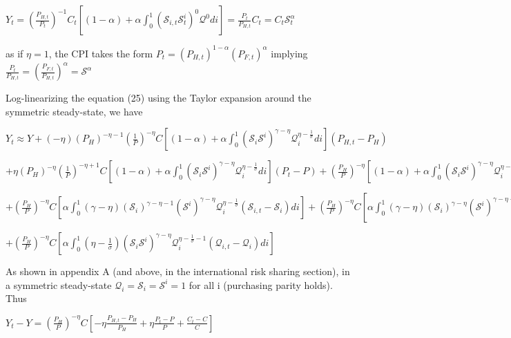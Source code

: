 \documentclass[
]{article}
\begin{document}
\(\displaystyle Y_t = \left( \frac{P_{H,t}}{P_t} \right)^{-1} C_t \left[ (1-\alpha) + \alpha \int_0^1 \left( \mathcal{S}_{i,t} \mathcal{S}_t^i\right)^{0} \mathcal{Q}^{0} di \right] = \frac{P_{t}}{P_{H,t}} C_t=C_t \mathcal{S}_t^\alpha\)

as if \(\eta=1\), the CPI takes the form
\(P_t=(P_{H,t})^{1-\alpha}(P_{F,t})^\alpha\) implying
\(\displaystyle \frac{P_t}{P_{H,t}}=\left( \frac{P_{F,t}}{P_{H,t}} \right)^\alpha=\mathcal{S}^\alpha\)

Log-linearizing the equation (25) using the Taylor expansion around the
symmetric steady-state, we have

\(\displaystyle Y_t \approx Y + (-\eta)\left( P_H \right)^{-\eta-1}\left( \frac{1}{P} \right)^{-\eta}C \left[ (1-\alpha) + \alpha \int_0^1 \left( \mathcal{S}_{i} \mathcal{S}^i\right)^{\gamma-\eta} \mathcal{Q}_i^{\eta-\frac{1}{\sigma}} di \right](P_{H,t}-P_H)\)

\(\displaystyle + \eta\left( P_H \right)^{-\eta}\left( \frac{1}{P} \right)^{-\eta+1}C \left[ (1-\alpha) + \alpha \int_0^1 \left( \mathcal{S}_{i} \mathcal{S}^i\right)^{\gamma-\eta} \mathcal{Q}_i^{\eta-\frac{1}{\sigma}} di \right](P_t-P) +\left( \frac{P_H}{P} \right)^{-\eta} \left[ (1-\alpha) + \alpha \int_0^1 \left( \mathcal{S}_{i} \mathcal{S}^i\right)^{\gamma-\eta} \mathcal{Q}_i^{\eta-\frac{1}{\sigma}} di \right](C_{t}-C)\)

\(\displaystyle +\left( \frac{P_H}{P} \right)^{-\eta} C \left[\alpha \int_0^1 (\gamma-\eta) \left( \mathcal{S}_{i} \right)^{\gamma-\eta-1} \left( \mathcal{S}^i\right)^{\gamma-\eta} \mathcal{Q}_i^{\eta-\frac{1}{\sigma}} (\mathcal{S}_{i,t}-\mathcal{S}_{i}) di \right] +\left( \frac{P_H}{P} \right)^{-\eta} C \left[\alpha \int_0^1 (\gamma-\eta) \left( \mathcal{S}_{i} \right)^{\gamma-\eta} \left( \mathcal{S}^i\right)^{\gamma-\eta-1} \mathcal{Q}_i^{\eta-\frac{1}{\sigma}} (\mathcal{S}_{t}^i-\mathcal{S}^i) di \right]\)

\(\displaystyle +\left( \frac{P_H}{P} \right)^{-\eta} C \left[\alpha \int_0^1 \left(\eta-\frac{1}{\sigma} \right) \left( \mathcal{S}_{i} \mathcal{S}^i\right)^{\gamma-\eta} \mathcal{Q}_i^{\eta-\frac{1}{\sigma}-1} (\mathcal{Q}_{i,t}-\mathcal{Q}_i) di \right]\)

As shown in appendix A (and above, in the international risk sharing
section), in a symmetric steady-state
\(\mathcal{Q}_i=\mathcal{S}_i=\mathcal{S}^i=1\) for all i (purchasing
parity holds). Thus

\(\displaystyle Y_t-Y = \left( \frac{P_H}{P} \right)^{-\eta}C \left[ -\eta \frac{P_{H,t}-P_H}{P_H} +\eta \frac{P_{t}-P}{P} + \frac{C_t-C}{C} \right]\)
\end{document}
